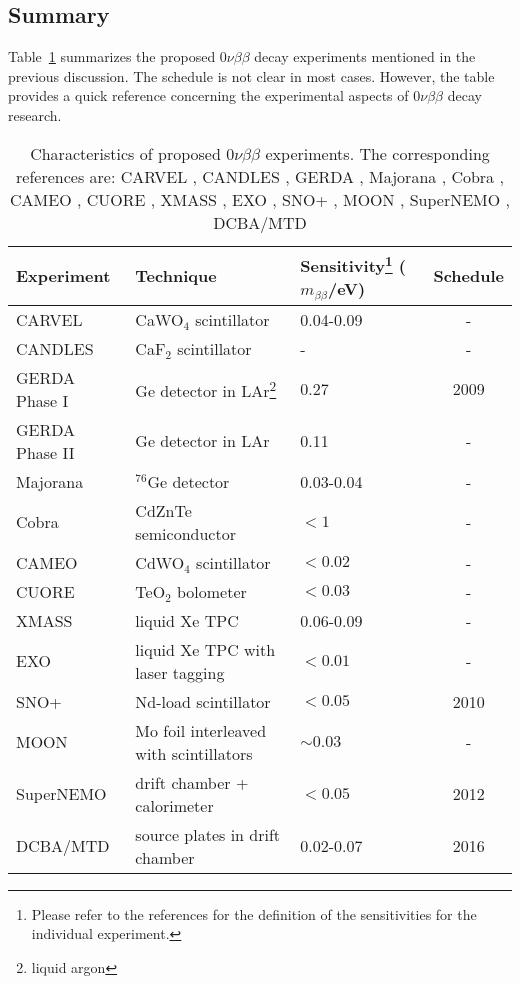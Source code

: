 \subsection{Summary}
\label{sec:exp:comp}
Table~\ref{tab:gerda:comp} summarizes the proposed $0\nu\beta\beta$
decay experiments mentioned in the previous discussion. The schedule
is not clear in most cases. However, the table provides a quick
reference concerning the experimental aspects of $0\nu\beta\beta$
decay research.
  
\begin{table}[htbp]
\centering
\caption{Characteristics of proposed $0\nu\beta\beta$ experiments.
The corresponding references are: CARVEL \cite{Zde05}, CANDLES
\cite{Hir08}, GERDA \cite{Sch05,Cal06}, Majorana \cite{Aal04}, Cobra
\cite{Kie03}, CAMEO \cite{Bel01}, CUORE \cite{Ard05}, XMASS
\cite{Nak02}, EXO \cite{Dani00}, SNO+ \cite{Zub07}, MOON \cite{Nak06},
SuperNEMO \cite{Sne08}, DCBA/MTD \cite{Ish07}}
\label{tab:gerda:comp}
\begin{minipage}{\linewidth}
\begin{tabular}{lllc} \hline 
Experiment & Technique & Sensitivity\footnote{Please refer to the 
references for the definition of the sensitivities for the individual 
experiment.} ($m_{\beta\beta}$/eV) & Schedule \\\hline
CARVEL & CaWO$_{4}$  scintillator & 0.04-0.09 & - \\
CANDLES & CaF$_{2}$ scintillator & - & - \\
GERDA Phase I & Ge detector in LAr\footnote{liquid argon} & 0.27 & 2009 \\
GERDA Phase II & Ge detector in LAr & 0.11 & - \\
Majorana & $^{76}$Ge detector & 0.03-0.04 & - \\
Cobra & CdZnTe semiconductor & $< 1$ & - \\
CAMEO & CdWO$_{4}$ scintillator & $< 0.02$ & - \\
CUORE & TeO$_{2}$ bolometer & $< 0.03$ & - \\
XMASS & liquid Xe TPC & 0.06-0.09 & - \\
EXO & liquid Xe TPC with laser tagging & $< 0.01$ & - \\
SNO+ & Nd-load scintillator & $< 0.05$ & 2010 \\ 
MOON & Mo foil interleaved with scintillators & $\sim0.03$ & -\\
SuperNEMO & drift chamber + calorimeter & $< 0.05$ & 2012 \\
DCBA/MTD & source plates in drift chamber & 0.02-0.07 & 2016 \\
\end{tabular}
\end{minipage}
\end{table}


